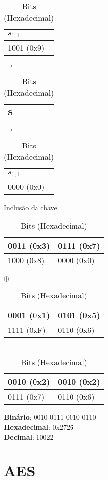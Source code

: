 \documentclass[
    article,            %
    11pt,               %
    oneside,            %
    a4paper,            %
    english,            %
    brazil,             %
    sumario=tradicional,
    ]{abntex2}
\begin{document}
\begin{table}[H]
\begin{tabular}{|l|}
\hline
$s_{1,1}$  \\ \hline
1001 (0x9)       \\ \hline
\end{tabular}
$\longrightarrow$
\begin{tabular}{|l|}
\hline
S  \\ \hline
\end{tabular}
$\longrightarrow$
\begin{tabular}{|l|}
\hline
$s_{1,1}$  \\ \hline
0000 (0x0)      \\ \hline
\end{tabular}

\caption*{Bits (Hexadecimal)}
\end{table}

\label{subsubsub:include-key-round2-dec}

\begin{table}[H]
\centering
\caption{Inclusão da chave}
\label{table-key_include-round2-dec}
\begin{tabular}{|l|l|}
\hline
0011 (0x3) & 0111 (0x7) \\ \hline
1000 (0x8) & 0000 (0x0) \\ \hline
\end{tabular}
$\oplus$
\begin{tabular}{|l|l|}
\hline
0001 (0x1) & 0101 (0x5) \\ \hline
1111 (0xF) & 0110 (0x6) \\ \hline
\end{tabular}
$=$
\begin{tabular}{|l|l|}
\hline
0010 (0x2) & 0010 (0x2)\\ \hline
0111 (0x7) & 0110 (0x6)\\ \hline
\end{tabular}
\caption*{Bits (Hexadecimal)}
\end{table}

\label{subsubsub:texto-decifrado-s-aes}
\indent\textbf{Binário}: 0010 0111 0010 0110 \\
\indent\textbf{Hexadecimal}: 0x2726 \\
\indent\textbf{Decimal}: 10022

\section{\textbf{AES}}
\end{document}

